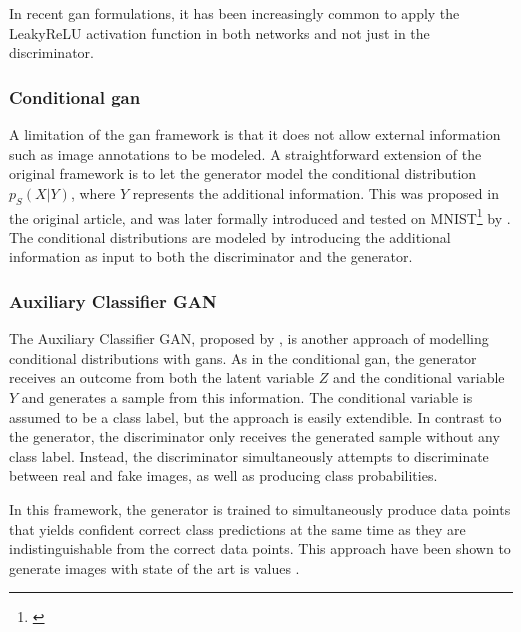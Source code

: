 In recent \acrshort{gan} formulations, it has been increasingly common to apply the LeakyReLU activation function in both networks and not just in the discriminator. 

\subsubsection{Conditional \acrshort{gan}}
A limitation of the \acrshort{gan} framework is that it does not allow external information such as image annotations to be modeled. A straightforward extension of the original framework is to let the generator model the conditional distribution $p_S(X|Y)$, where $Y$ represents the additional information. This was proposed in the original article, and was later formally introduced and tested on MNIST\footnote{\textcite{lecun2010mnist}} by \textcite{mirza2014conditional}. The conditional distributions are modeled by introducing the additional information as input to both the discriminator and the generator.


\subsubsection{Auxiliary Classifier GAN}
The Auxiliary Classifier GAN, proposed by \textcite{odena2016conditional}, is another approach of modelling conditional distributions with \acrshort{gans}. As in the conditional \acrshort{gan}, the generator receives an outcome from both the latent variable $Z$ and the conditional variable $Y$ and generates a sample from this information. The conditional variable is assumed to be a class label, but the approach is easily extendible. In contrast to the generator, the discriminator only receives the generated sample without any class label. Instead, the discriminator simultaneously attempts to discriminate between real and fake images, as well as producing class probabilities.

In this framework, the generator is trained to simultaneously produce data points that yields confident correct class predictions at the same time as they are indistinguishable from the correct data points. This approach have been shown to generate images with state of the art \acrlong{is} values \parencite{odena2016conditional}.


